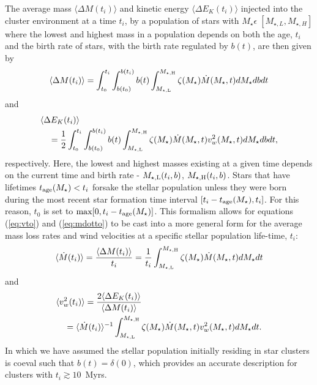\documentclass[fleqn,usenatbib]{mnras}
\begin{document}
The average mass $\langle \Delta M(t_i)\rangle$  and kinetic energy  $\langle \Delta E_K(t_i) \rangle$  injected  into the cluster environment at  a time $t_i$,  by a population of stars with $M_\star \epsilon \;[M_{\star,L}, M_{\star,H}]$ where the lowest and highest mass in a population depends on both the age, $t_i$ and the birth rate of stars, with the birth rate regulated by $b(t)$, are then given by
 \begin{equation}
\langle \Delta M(t_i) \rangle = \int_{t_0}^{t_i} \int_{b(t_0)}^{b(t_i)}  b(t) \int_{M_{\rm \star, L}}^{M_{\rm \star, H}} 
\zeta(M_\star) \dot{M}(M_\star,t)  dM_\star db dt
\label{deltam}
\end{equation}
and
 \begin{equation}
 \begin{multlined}
\langle \Delta E_K(t_i) \rangle \\
= \frac{1}{2} \int_{t_0}^{t_i} \int_{b(t_0)}^{b(t_i)} b(t) \int_{M_{\rm \star, L}}^{M_{\rm \star, H}} 
\zeta(M_\star) \dot{M}(M_\star,t) v_w^2(M_\star,t) dM_\star db dt,
\label{deltae}
 \end{multlined}
\end{equation}
respectively.  Here, the lowest and highest masses existing at a given time depends on the current time and birth rate - $M_{\rm{\star,L}}(t_i,b)$, $M_{\rm{\star,H}}(t_i,b)$.
Stars that have lifetimes  $t_{\rm age}(M_\star) < t_i$ forsake the stellar population unless they were born during the most recent star formation time  interval $[t_i - t_{\rm age}(M_\star), t_i]$. For this reason,  $t_0$ is set to  $\max[0, t_i - t_{\rm age}(M_\star)]$. This formalism allows for equations (\ref{eq:vto}) and (\ref{eq:mdotto}) to be cast  into a more general form for the average mass loss rates and wind velocities at a specific stellar population life-time, $t_i$:
\begin{align}
 \langle \dot{M}(t_i) \rangle = {\langle \Delta M(t_i) \rangle \over  t_i} =  \frac{1}{t_i} \int_{M_{\rm \star, L}}^{M_{\rm \star, H}}  \zeta(M_\star) \dot{M}(M_\star,t)  dM_\star dt
 \label{eq:mdotpop}
\end{align}
and
\begin{equation}
\begin{multlined}
 \langle v_w^2(t_i) \rangle = {2\langle\Delta E_K(t_i)\rangle \over \langle\Delta M(t_i)\rangle}  \\
=  \langle \dot{M}(t_i)\rangle^{-1} \int_{M_{\rm \star, L}}^{M_{\rm \star, H}} \zeta(M_\star) \dot{M}(M_\star,t)  v_w^2(M_\star,t) dM_\star dt.
 \end{multlined}
\label{eq:vpop}
\end{equation}
In which we have assumed the stellar population initially residing in star clusters is coeval such that 
$b(t) = \delta(0)$, which provides an accurate description for clusters with $t_i \gtrsim 10$~Myrs.
\end{document}
